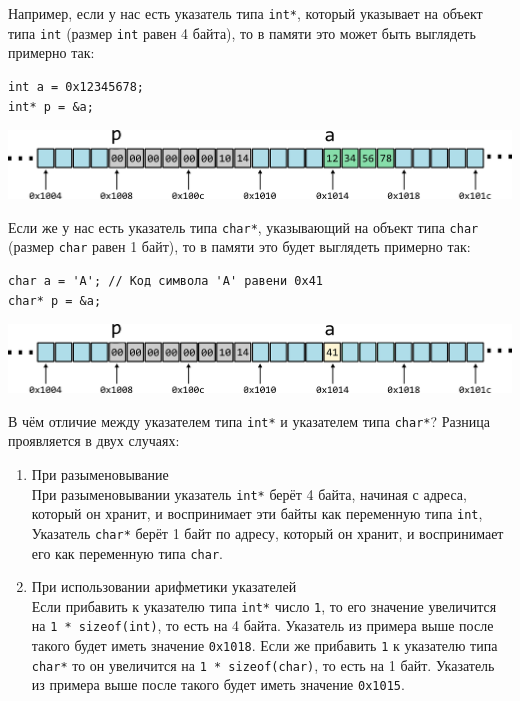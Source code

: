 \documentclass[10pt]{article}
\begin{document}
Например, если у нас есть указатель типа \texttt{int*}, который указывает на объект типа \texttt{int} (размер \texttt{int} равен 4 байта), то в памяти это может быть выглядеть примерно так:
\begin{lstlisting}
int a = 0x12345678;
int* p = &a;
\end{lstlisting}

\begin{center}
\includegraphics[scale=1]{../images/memory_3_pointer_to_int_b.png}
\end{center}

Если же у нас есть указатель типа \texttt{char*}, указывающий на объект типа \texttt{char} (размер \texttt{char} равен 1 байт), то в памяти это будет выглядеть примерно так:
\begin{lstlisting}
char a = 'A'; // Код символа 'A' равени 0x41 
char* p = &a;
\end{lstlisting}

\begin{center}
\includegraphics[scale=1]{../images/memory_3_pointer_to_char_b.png}
\end{center}

\newpage
В чём отличие между указателем типа \texttt{int*} и указателем типа \texttt{char*}? Разница проявляется в двух случаях:
\begin{enumerate}
\item При разыменовывание\\
При разыменовывании указатель \texttt{int*} берёт 4 байта, начиная с адреса, который он хранит, и воспринимает эти байты как переменную типа \texttt{int}, Указатель \texttt{char*} берёт 1 байт по адресу, который он хранит, и воспринимает его как переменную типа \texttt{char}.

\item При использовании арифметики указателей\\
Если прибавить к указателю типа \texttt{int*} число \texttt{1}, то его значение увеличится на \texttt{1 * sizeof(int)}, то есть на 4 байта. Указатель из примера выше после такого будет иметь значение \texttt{0x1018}. Если же прибавить \texttt{1} к указателю типа \texttt{char*} то он увеличится на \texttt{1 * sizeof(char)}, то есть на 1 байт. Указатель из примера выше после такого будет иметь значение \texttt{0x1015}.
\end{enumerate}
\end{document}

